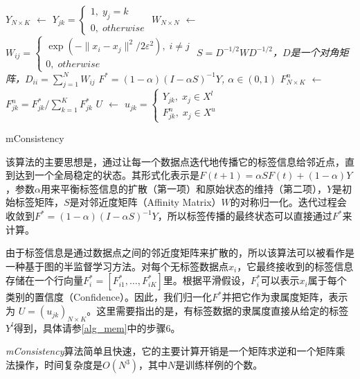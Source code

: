 \IncMargin{1em}
\begin{algorithm}
\BlankLine
\emph{$Y_{N \times K}$ $\leftarrow$ $Y_{jk}=\begin{cases}1,\; y_{j}=k \\0,\; otherwise\end{cases}$}\;
\emph{$W_{N \times N}$ $\leftarrow$ $W_{ij}=\begin{cases}\exp(-\|x_{i}-x_{j}\|^{2}/2\varepsilon^{2}),\; i\neq j \\0,\; otherwise\end{cases}$}\;
\emph{$S=D^{-1/2}WD^{-1/2}$，$D$是一个对角矩阵，$D_{ii}=\sum_{j=1}^{N}W_{ij}$}\;
\emph{$F^{*}=(1-\alpha)(I-\alpha S)^{-1}Y$, $\alpha\in(0,1)$}\;
\emph{$F^{n}_{N \times K}$ $\leftarrow$ $F^{n}_{jk}=F^{*}_{jk}/\sum_{k=1}^{K}F^{*}_{jk}$}\;
\emph{$U$ $\leftarrow$ $u_{jk}=\begin{cases}Y_{jk},\; x_{j}\in X^{l} \\F^{n}_{jk},\; x_{j}\in X^{u}\end{cases}$}\;
\caption{mConsistency}\label{alg_mem}
\end{algorithm}
\DecMargin{1em}

该算法的主要思想是，通过让每一个数据点迭代地传播它的标签信息给邻近点，直到达到一个全局稳定的状态\citep{zhou2004learning}。其形式化表示是\(F(t+1)=\alpha SF(t)+(1-\alpha)Y\)，参数\(\alpha\)用来平衡标签信息的扩散（第一项）和原始状态的维持（第二项），\(Y\)是初始标签矩阵，\(S\)是对邻近度矩阵（Affinity Matrix）\(W\)的对称归一化。迭代过程会收敛到\(F^{*}=(1-\alpha)(I-\alpha S)^{-1}Y\)\citep{zhou2004learning}，所以标签传播的最终状态可以直接通过\(F^{*}\)来计算。

由于标签信息是通过数据点之间的邻近度矩阵来扩散的，所以该算法可以被看作是一种基于图的半监督学习方法。对每个无标签数据点\(x_{i}\)，它最终接收到的标签信息存储在一个行向量\(F^{*}_{i}=[F^{*}_{i1},\dots,F^{*}_{iK}]\)里。根据平滑假设，\(F^{*}_{i}\)可以表示\(x_{i}\)属于每个类别的置信度（Confidence）。因此，我们归一化\(F^{*}\)并把它作为隶属度矩阵，表示为 \(U=(u_{jk})_{N \times K}\)。这里需要指出的是，有标签数据的隶属度直接从给定的标签\(Y^{l}\)得到，具体请参\autoref{alg_mem}中的步骤6。

\textit{mConsistency}算法简单且快速，它的主要计算开销是一个矩阵求逆和一个矩阵乘法操作，时间复杂度是\(O(N^{3})\)，其中\(N\)是训练样例的个数。

